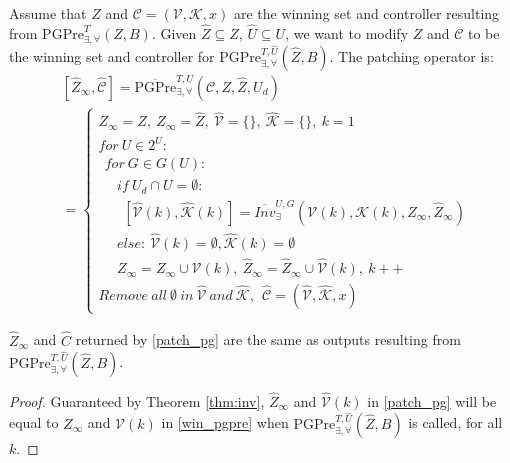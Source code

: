 Assume that $ Z $ and $ \mathcal{C} = (\mathcal{V},\mathcal{K},x) $ are the winning set and controller resulting from  $ \text{PGPre}_{\exists,\forall}^{T} (Z,B)$. Given $ \widehat{Z}\subseteq Z $,  $ \widehat{U}\subseteq U $, we want to modify $ Z $ and $ \mathcal{C} $ to be the winning set and controller for $ \text{PGPre}_{\exists, \forall}^{T,\widehat{U}}(\widehat{Z},B)$. The patching operator is:
\begin{align}
&[\widehat{Z}_{\infty},\widehat{\mathcal{C}}]=\overline{\text{PGPre}}_{\exists,\forall}^{T,U} (\mathcal{C},Z,\widehat{Z},U_d)\\
&= \begin{cases}
Z_{\infty} = Z,\ \widehat{Z}_{\infty}=\widehat{Z},\ \widehat{\mathcal{V}}=\{\},\ \widehat{\mathcal{K}}=\{\},\ k = 1\\
for\ U\in 2^U:\\
\ \ for\ G\in G(U):\\
\ \ \ \ \ \ if\ U_d\cap U = \emptyset:\\
\ \ \ \ \ \ \ \  [\widehat{\mathcal{V}}(k),\widehat{\mathcal{K}}(k)]=\overline{Inv}_{\exists}^{U,G}(\mathcal{V}(k),\mathcal{K}(k),Z_\infty, \widehat{Z}_\infty)\\
\ \ \ \ \ \ else:\ \widehat{\mathcal{V}}(k)=\emptyset, \widehat{\mathcal{K}}(k) = \emptyset\\
\ \ \ \ \ \  Z_\infty = Z_\infty\cup \mathcal{V}(k),\ \widehat{Z}_{\infty} = \widehat{Z}_{\infty} \cup \widehat{\mathcal{V}}(k),\ k++\\
Remove\ all\ \emptyset\ in\ \widehat{\mathcal{V}}\ and \ \widehat{\mathcal{K}},\ \ 
\widehat{\mathcal{C}} = (\widehat{\mathcal{V}},\widehat{\mathcal{K}},x)
\end{cases}\label{patch_pg}
\end{align}

\begin{theorem}
	$ \widehat{Z}_\infty $ and $ \widehat{C} $ returned by \eqref{patch_pg} are the same as outputs resulting from $ \text{PGPre}_{\exists, \forall}^{T,\widehat{U}}(\widehat{Z},B)$.	\label{thm:pg}
\end{theorem}

\begin{proof}
	Guaranteed by Theorem \ref{thm:inv}, $ \widehat{Z}_\infty $ and $ \widehat{\mathcal{V}}(k) $ in \eqref{patch_pg} will be equal to $ Z_{\infty} $ and $ \mathcal{V}(k) $ in \eqref{win_pgpre} when $ \text{PGPre}^{T,\widehat{U}}_{\exists,\forall}(\widehat{Z},B) $ is called, for all $ k $. 
\end{proof}

